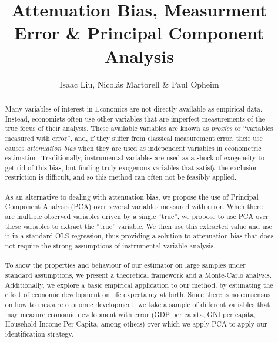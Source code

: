 \documentclass[12pt]{article}
\begin{document}
\thispagestyle{firststyle}

\author{Isaac Liu, Nicol\'as Martorell \& Paul Opheim}
\title{Attenuation Bias, Measurment Error \& Principal Component Analysis} 
\maketitle



\begin{abstract}
    Many variables of interest in Economics are not directly available as empirical data. Instead, economists often use other variables that are imperfect measurements of the true focus of their analysis. These available variables are known as \textit{proxies} or ``variables measured with error'', and, if they suffer from classical measurement error, their use causes \textit{attenuation bias} when they are used as independent variables in econometric estimation. Traditionally, instrumental variables are used as a shock of exogeneity to get rid of this bias, but finding truly exogenous variables that satisfy the exclusion restriction is difficult, and so this method can often not be feasibly applied.\\
    \\
    As an alternative to dealing with attenuation bias, we propose the use of Principal Component Analysis (PCA) over several variables measured with error. When there are multiple observed variables driven by a single ``true'', we propose to use PCA over these variables to extract the ``true'' variable. We then use this extracted value and use it in a standard OLS regression, thus providing a solution to attenuation bias that does not require the strong assumptions of instrumental variable analysis.\\
    \\
    To show the properties and behaviour of our estimator on large samples under standard assumptions, we present a theoretical framework and a Monte-Carlo analysis. Additionally, we explore a basic empirical application to our method, by estimating the effect of economic development on life expectancy at birth. Since there is no consensus on how to measure economic development, we take a sample of different variables that may measure economic development with error (GDP per capita, GNI per capita, Household Income Per Capita, among others) over which we apply PCA to apply our identification strategy.
\end{abstract}
\end{document}
